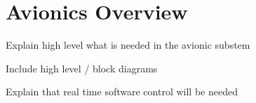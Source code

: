 \section{Avionics Overview}

Explain high level what is needed in the avionic substem

Include high level / block diagrams

Explain that real time software control will be needed